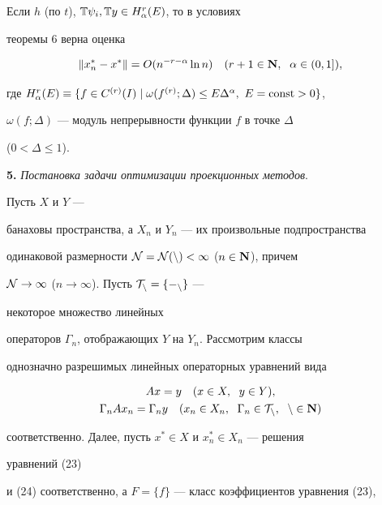 \begin{cor} 


Если $h$ (по $t$), $\Bbb T\psi_i,\Bbb T y\in H^r_\alpha(E)$, то в условиях 


теоремы 6 верна оценка 


$$ 


\|x^*_n-x^*\|=O(n^{-r-\alpha}\ln n)\quad 


(r+1\in\bold N,\ \; \alpha\in(0,1]), 


$$ 


где $H^r_\alpha(E)\equiv\{f\in C^{(r)}(I)\mid \omega(f^{(r)};\Delta)\le 


E\Delta^\alpha,\ E=\const>0\}$, 


$\omega(f;\Delta)$ --- модуль непрерывности функции $f$ в точке $\Delta$ 


($0<\Delta\le1$). 


\end{cor} 


 


{\bf 5.} {\it Постановка задачи оптимизации проекционных методов}. 


Пусть $X$ и $Y$ --- 


банаховы пространства, а $X_n$ и $Y_n$ --- их произвольные подпространства 


одинаковой размерности $\cal N=\cal N(n)<\infty$ ($n\in\bold N$), причем 


$\cal N\to\infty$ ($n\to\infty$). Пусть $\cal T_n=\{\Gamma_n\}$ --- 


некоторое множество линейных 


операторов $\Gamma_n$, отображающих $Y$ на $Y_n$. Рассмотрим классы 


однозначно разрешимых линейных операторных уравнений вида 


\begin{gather} 


A x=y\quad (x\in X,\ \; y\in Y), \\ 


\Gamma_n A x_n=\Gamma_n y\quad 


(x_n\in X_n,\ \; \Gamma_n\in\cal T_n,\ \; n\in\bold N) 


\end{gather} 


соответственно. Далее, пусть $x^*\in X$ и $x^*_n\in X_n$ --- решения 


уравнений (23) 


и (24) соответственно, а $F=\{f\}$ --- класс коэффициентов уравнения (23), 


